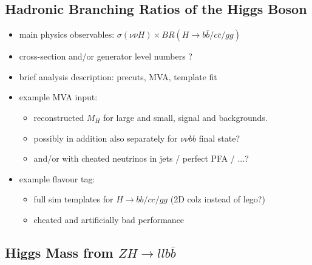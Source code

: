 \subsection{Hadronic Branching Ratios of the Higgs Boson}
\begin{itemize}
\item main physics observables: $\sigma(\nu\bar{\nu} H)\times BR(H\to b\bar{b} / c\bar{c} / gg)$
\item cross-section and/or generator level numbers ? 
\item brief analysis description: precuts, MVA, template fit
\item example MVA input: 
  \begin{itemize}
     \item reconstructed $M_H$ for large and small, signal and backgrounds. 
     \item possibly in addition also separately for $\nu\nu bb$ final state?
     \item and/or with cheated neutrinos in jets / perfect PFA / ...?
  \end{itemize}
\item example flavour tag: 
  \begin{itemize}
     \item full sim templates for $H \to bb / cc / gg$ (2D colz instead of lego?)
     \item cheated and artificially bad performance
  \end{itemize}
\end{itemize}

\subsection{Higgs Mass from $ZH \to ll b\bar{b}$}
